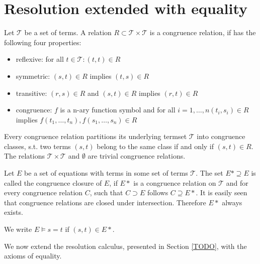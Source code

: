 \section*{Resolution extended with equality}

Let $\mathcal{T}$ be a set of terms.
A relation $R \subset \mathcal{T} \times \mathcal{T}$ is a congruence relation, if has the following four properties:
\begin{itemize}
	\item reflexive: for all $t \in \mathcal{T}: (t,t) \in R$
	\item symmetric: $(s,t) \in R$ implies $(t,s) \in R$
	\item transitive: $(r,s) \in R$ and $(s,t) \in R$ implies $(r,t) \in R$
	\item congruence: $f$ is a n-ary function symbol and for all $i = 1,\ldots,n (t_i,s_i) \in R$ implies $f(t_1,\ldots,t_n),f(s_1,\ldots,s_n) \in R$
\end{itemize}

Every congruence relation partitions its underlying termset $\mathcal{T}$ into congruence classes, s.t. two terms $(s,t)$ belong to the same class if and only if $(s,t) \in R$.
The relations $\mathcal{T} \times \mathcal{T}$ and $\emptyset$ are trivial congruence relations.

Let $E$ be a set of equations with terms in some set of terms $\mathcal{T}$.
The set $E* \supseteq E$ is called the congruence closure of $E$, 
if $E*$ is a congruence relation on $\mathcal{T}$ and for every congruence relation $C$, such that $C \supset E$ follows $C \supseteq E*$.
It is easily seen that congruence relations are closed under intersection.
Therefore $E*$ always exists.

We write $E \models s = t$ if $(s,t) \in E*$.

We now extend the resolution calculus, presented in Section \ref{TODO}, with the axioms of equality.

